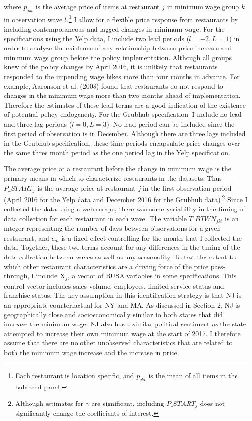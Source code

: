 \documentclass[11pt]{article}
\begin{document}
\noindent where $p_{jkt}$ is the average price of items at restaurant $j$ in minimum wage group $k$ in observation wave $t$.\footnote{Each restaurant is location specific, and $p_{jkt}$ is the mean of all items in the balanced panel. } I allow for a flexible price response from restaurants by including contemporaneous and lagged changes in minimum wage. For the specifications using the Yelp data, I include two lead periods ($l=-2, L=1$) in order to analyze the existence of any relationship between price increase and minimum wage group before the policy implementation.
 Although all groups knew of the policy changes by April 2016, it is unlikely that restaurants responded to the impending wage hikes more than four months in advance. For example, Aaronson et al. (2008) found that restaurants do not respond to changes in the minimum wage more than two months ahead of implementation. Therefore the estimates of these lead terms are a good indication of the existence of potential policy endogeneity. For the Grubhub specification, I include no lead and three lag periods ($l=0, L=3$). No lead period can be included since the first period of observation is in December. Although there are three lags included in the Grubhub specification, these time periods encapsulate price changes over the same three month period as the one period lag in the Yelp specification. 

The average price at a restaurant before the change in minimum wage is the primary means in which to characterize restaurants in the datasets. Thus $P\_START_{j}$ is the average price at restaurant $j$ in the first observation period (April 2016 for the Yelp data and December 2016 for the Grubhub data).\footnote{Although estimates for $\gamma$ are significant, including $P\_START_{j}$ does not significantly change the coefficients of interest.} Since I collected the data using a web scrape, there was some variability in the timing of data collection for each restaurant in each wave. The variable $T\_BTWN_{jkt}$ is an integer representing the number of days between observations for a given restaurant, and $\epsilon_m$ is a fixed effect controlling for the month that I collected the data. Together, these two terms account for any differences in the timing of the data collection between waves as well as any seasonality. To test the extent to which other restaurant characteristics are a driving force of the price pass-through, I include $\boldsymbol{X}_j$, a vector of RUSA variables in some specifications. This control vector includes sales volume, employees, limited service status and franchise status. The key assumption in this identification strategy is that NJ is an appropriate counterfactual for NY and MA. As discussed in Section 2, NJ is geographically close and socioeconomically similar to both states that did increase the minimum wage. NJ also has a similar political sentiment as the state attempted to increase their own minimum wage at the start of 2017. I therefore assume that there are no other unobserved characteristics that are related to both the minimum wage increase and the increase in price. 
\end{document}
